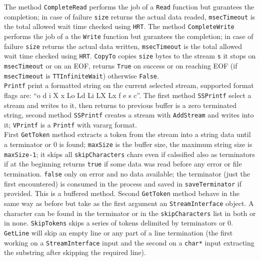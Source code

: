 The method \texttt{CompleteRead} performs the job of a \texttt{Read} function but gurantees the completion; in case of failure \texttt{size} returns the actual data readed, \texttt{msecTimeout} is the total allowed wait time checked using \texttt{HRT}.
The method \texttt{CompleteWrite} performs the job of a the \texttt{Write} function but gurantees the completion; in case of failure \texttt{size} returns the actual data written, \texttt{msecTimeout} is the total allowed wait time checked using \texttt{HRT}.
\texttt{CopyTo} copies \texttt{size} bytes to the stream \texttt{s} it stops on \texttt{msecTimeout} or on an EOF, returns \texttt{True} on success or on reaching EOF (if \texttt{msecTimeout} is \texttt{TTInfiniteWait}) otherwise \texttt{False}.\\


\texttt{Printf} print a formatted string on the current selected stream, supported format flags are: 
``o d i X x Lo Ld Li LX Lx f e s c''. The first method \texttt{SSPrintf} select a stream and writes to it, then returns to previous buffer is a zero terminated string, second method \texttt{SSPrintf} creates a stream with \texttt{AddStream} and writes into it; \texttt{VPrintf} is a \texttt{Printf} with vararg format. \\


First \texttt{GetToken} method extracts a token from the stream into a string data until a terminator or 0 is found; \texttt{maxSize} is the buffer size, the maximum string size is \texttt{maxSize-1}; it skips all \texttt{skipCharacters} chars even if calssified also as terminators if at the beginning returns \texttt{true} if some data was read before any error or file termination. \texttt{false} only on error and no data available; the terminator (just the first encountered) is consumed in the process and saved in \texttt{saveTerminator} if provided. This is a buffered method.
Second \texttt{GetToken} method behave in the same way as before but take as the first argument an \texttt{StreamInterface} object. A character can be found in the terminator or in the \texttt{skipCharacters} list in both or in none.
\texttt{SkipTokens} skips a series of tokens delimited by terminators or 0.
\texttt{GetLine} will skip an empty line or any part of a line termination (the first working on a \texttt{StreamInterface} input and the second on a \texttt{char*} input extracting the substring after skipping the required line).

